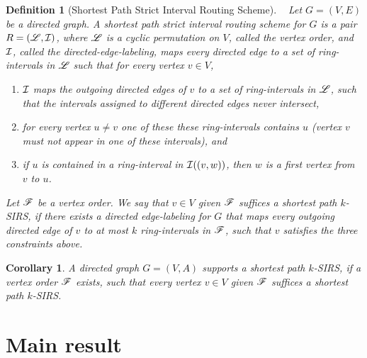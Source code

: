 \documentclass[10pt]{article}
\newtheorem{corollary}[theorem]{Corollary}
\newtheorem{definition}[theorem]{Definition}
\begin{document}
\begin{definition}[Shortest Path Strict Interval Routing Scheme]\label{defiIRS}
~ Let $G=(V,E)$ be a directed graph.
A \emph{shortest path strict interval routing scheme for $G$} 
is a pair $R=(\mathscr{L},\mathcal{I})$, where $\mathscr{L}$ is a cyclic permutation on $V$, 
called the \emph{vertex order}, and $\mathcal{I}$, called the \emph{directed-edge-labeling}, maps 
every directed edge to a set of ring-intervals in $\mathscr{L}$ such that for every vertex $v\in V$,
\begin{enumerate}

\item 
$\mathcal{I}$ maps the outgoing directed edges of $v$ to a set of ring-intervals 
in $\mathscr{L}$, such that the intervals
assigned to different directed edges never intersect,

\item
for every vertex $u\neq v$  one of these these ring-intervals 
contains $u$ (vertex $v$ must not appear in one of these intervals), and

\item
if $u$ is contained in a ring-interval in $\mathcal{I}((v,w))$, then $w$ is a first vertex 
from $v$ to $u$.
\end{enumerate}

Let $\mathscr{F}$ be a vertex order.
We say that  \emph{$v\in V$ given $\mathscr{F}$ suffices a shortest path $k$-SIRS}, if  
there exists a directed edge-labeling for $G$ that maps every outgoing directed edge of $v$ to at most 
$k$ ring-intervals in $\mathscr{F}$, such that $v$ satisfies the three constraints above.
\end{definition}



\begin{corollary}\label{coro:neu}
A directed graph $G=(V,A)$ supports a 
shortest path $k$-SIRS, if a vertex order $\mathscr{F}$ exists, such that every 
vertex $v\in V$  given $\mathscr{F}$ suffices a shortest path $k$-SIRS.
\end{corollary}











\section{Main result\label{main}}
\end{document}
